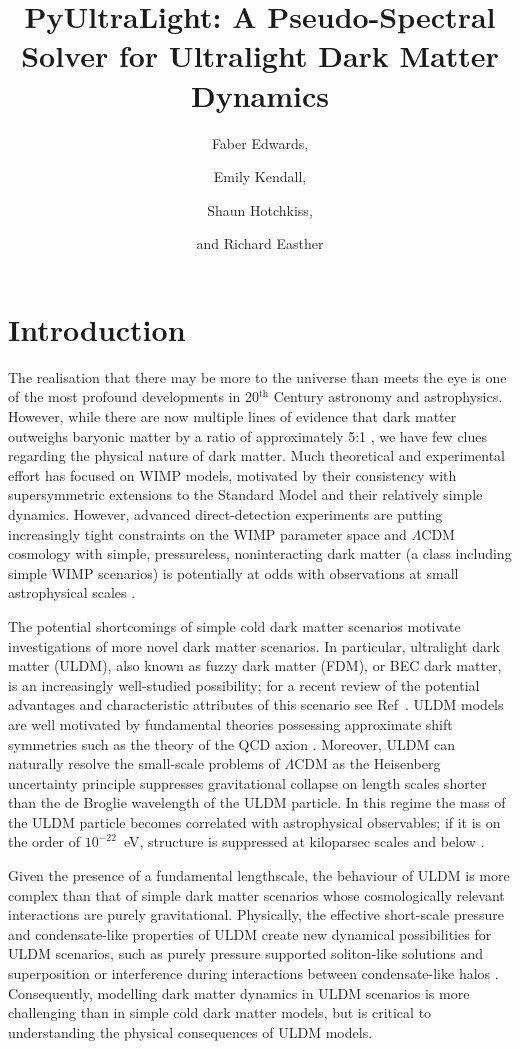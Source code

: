 \documentclass[a4paper,11pt]{article}
\title{ PyUltraLight: A Pseudo-Spectral Solver for Ultralight Dark Matter Dynamics}
\author[]{Faber Edwards,}
\author[]{Emily Kendall,}
\author[]{Shaun Hotchkiss,}
\author[]{and Richard Easther}
\affiliation[]{Department of Physics, University of Auckland, Private Bag 92019, Auckland, New Zealand}
\begin{document}
\maketitle
\flushbottom

\section{Introduction}
\label{sec:intro}

The realisation that there may be more to the universe than meets the eye is one of the most profound developments in 20$^{\textrm{th}}$ Century astronomy and astrophysics. However, while there are now multiple lines of evidence that dark matter outweighs baryonic matter by a ratio of approximately 5:1 \cite{Ade:2015xua}, we have few clues regarding the physical nature of dark matter.  Much theoretical and experimental effort has focused on  WIMP models, motivated by their consistency with supersymmetric extensions to the Standard Model and their relatively simple dynamics. However, advanced direct-detection experiments are putting increasingly tight constraints on the WIMP parameter space \cite{Tan:2016zwf, Akerib:2016vxi} and $\Lambda$CDM cosmology with simple, pressureless, noninteracting dark matter (a class including simple WIMP scenarios) is potentially at odds with observations at small astrophysical scales \cite{Bull:2015stt}.  

The potential shortcomings of simple cold dark matter scenarios motivate investigations of more novel dark matter scenarios. In particular, ultralight dark matter (ULDM), also known as fuzzy dark matter (FDM), or BEC dark matter, is an increasingly well-studied possibility; for a recent review of the potential advantages and characteristic attributes of this scenario see Ref~\cite{Hui:2016ltb}. ULDM models are well motivated by fundamental theories possessing approximate shift symmetries such as the theory of the QCD axion \cite{Kim:2008hd, Marsh:2015xka}. Moreover, ULDM can naturally resolve the small-scale problems of $\Lambda$CDM as the Heisenberg uncertainty principle suppresses gravitational collapse on length scales shorter than the de Broglie wavelength of the ULDM particle. In this regime the mass of the ULDM particle becomes correlated with astrophysical observables; if it is on the order of $10^{-22}$~eV, structure is suppressed at kiloparsec scales and below \cite{Hu:2000ke}. 


Given the presence of a fundamental  lengthscale, the behaviour of ULDM is more complex than that of simple dark matter scenarios whose cosmologically relevant interactions are purely gravitational. Physically, the effective short-scale pressure and  condensate-like properties of ULDM  create new dynamical possibilities for ULDM scenarios, such as  purely pressure supported soliton-like solutions  \cite{Marsh:2015wka} and superposition or interference during interactions between condensate-like halos \cite{Schwabe:2016rze}. Consequently, modelling dark matter dynamics in ULDM scenarios is more challenging than in simple cold dark matter models, but is critical to understanding the physical consequences of ULDM models. 
\end{document}
